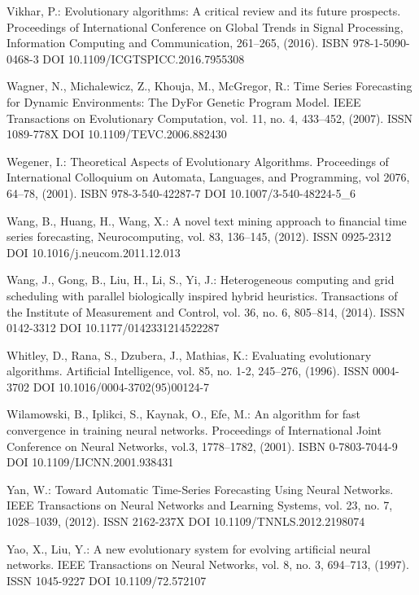 \begin{thebibliography}{99.}
 Vikhar, P.: Evolutionary algorithms: A critical review and its future prospects. Proceedings of International Conference on Global Trends in Signal Processing, Information Computing and Communication, 261--265, (2016). ISBN 978-1-5090-0468-3 DOI 10.1109/ICGTSPICC.2016.7955308

 Wagner, N., Michalewicz, Z., Khouja, M., McGregor, R.: Time Series Forecasting for Dynamic Environments: The DyFor Genetic Program Model. IEEE Transactions on Evolutionary Computation, vol. 11, no. 4, 433--452, (2007). ISSN 1089-778X DOI 10.1109/TEVC.2006.882430

 Wegener, I.: Theoretical Aspects of Evolutionary Algorithms. Proceedings of International Colloquium on Automata, Languages, and Programming, vol 2076, 64--78, (2001). ISBN 978-3-540-42287-7 DOI 10.1007/3-540-48224-5\_6

 Wang, B., Huang, H., Wang, X.: A novel text mining approach to financial time series forecasting, Neurocomputing, vol. 83, 136--145, (2012). ISSN 0925-2312 DOI 10.1016/j.neucom.2011.12.013

 Wang, J., Gong, B., Liu, H., Li, S., Yi, J.: Heterogeneous computing and grid scheduling with parallel biologically inspired hybrid heuristics. Transactions of the Institute of Measurement and Control, vol. 36, no. 6, 805--814, (2014). ISSN 0142-3312 DOI 10.1177/0142331214522287

 Whitley, D., Rana, S., Dzubera, J., Mathias, K.: Evaluating evolutionary algorithms. Artificial Intelligence, vol. 85, no. 1-2, 245--276, (1996). ISSN 0004-3702 DOI 10.1016/0004-3702(95)00124-7

 Wilamowski, B., Iplikci, S., Kaynak, O., Efe, M.: An algorithm for fast convergence in training neural networks. Proceedings of International Joint Conference on Neural Networks, vol.3, 1778--1782, (2001). ISBN 0-7803-7044-9 DOI 10.1109/IJCNN.2001.938431

 Yan, W.: Toward Automatic Time-Series Forecasting Using Neural Networks. IEEE Transactions on Neural Networks and Learning Systems, vol. 23, no. 7, 1028--1039, (2012). ISSN 2162-237X DOI 10.1109/TNNLS.2012.2198074

 Yao, X., Liu, Y.: A new evolutionary system for evolving artificial neural networks. IEEE Transactions on Neural Networks, vol. 8, no. 3, 694--713, (1997). ISSN 1045-9227 DOI 10.1109/72.572107


\end{thebibliography}
